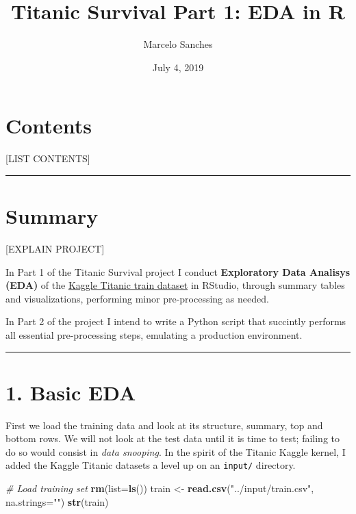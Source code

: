 \documentclass[]{article}
\title{Titanic Survival Part 1: EDA in R}
\author{Marcelo Sanches}
\date{July 4, 2019}
\newenvironment{Shaded}{\begin{snugshade}}{\end{snugshade}}
\newcommand{\KeywordTok}[1]{\textcolor[rgb]{0.13,0.29,0.53}{\textbf{#1}}}
\newcommand{\DataTypeTok}[1]{\textcolor[rgb]{0.13,0.29,0.53}{#1}}
\newcommand{\StringTok}[1]{\textcolor[rgb]{0.31,0.60,0.02}{#1}}
\newcommand{\CommentTok}[1]{\textcolor[rgb]{0.56,0.35,0.01}{\textit{#1}}}
\newcommand{\NormalTok}[1]{#1}
\begin{document}
\maketitle

\section{Contents}\label{contents}

{[}LIST CONTENTS{]}

\begin{center}\rule{0.5\linewidth}{\linethickness}\end{center}

\section{Summary}\label{summary}

{[}EXPLAIN PROJECT{]}

In Part 1 of the Titanic Survival project I conduct \textbf{Exploratory
Data Analisys (EDA)} of the
\href{https://www.kaggle.com/c/titanic/data}{Kaggle Titanic train
dataset} in RStudio, through summary tables and visualizations,
performing minor pre-processing as needed.

In Part 2 of the project I intend to write a Python script that
succintly performs all essential pre-processing steps, emulating a
production environment.

\begin{center}\rule{0.5\linewidth}{\linethickness}\end{center}

\section{1. Basic EDA}\label{basic-eda}

First we load the training data and look at its structure, summary, top
and bottom rows. We will not look at the test data until it is time to
test; failing to do so would consist in \emph{data snooping}. In the
spirit of the Titanic Kaggle kernel, I added the Kaggle Titanic datasets
a level up on an \texttt{input/} directory.

\begin{Shaded}
\begin{Highlighting}[]
\CommentTok{# Load training set }
\KeywordTok{rm}\NormalTok{(}\DataTypeTok{list=}\KeywordTok{ls}\NormalTok{()) }
\NormalTok{train <-}\StringTok{ }\KeywordTok{read.csv}\NormalTok{(}\StringTok{"../input/train.csv"}\NormalTok{, }\DataTypeTok{na.strings=}\StringTok{""}\NormalTok{)}
\KeywordTok{str}\NormalTok{(train)}
\end{Highlighting}
\end{Shaded}
\end{document}
